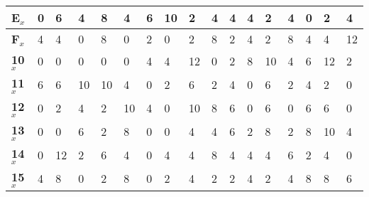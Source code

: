\begin{longtable}[c]{|l|l|l|l|l|l|l|l|l|l|l|l|l|l|l|l|l|}
\textbf{E$_x$}  & 0              & 6              & 4              & 8              & 4              & 6              & 10             & 2              & 4              & 4              & 4              & 2              & 4              & 0              & 2              & 4              \\ \hline
\textbf{F$_x$}  & 4              & 4              & 0              & 8              & 0              & 2              & 0              & 2              & 8              & 2              & 4              & 2              & 8              & 4              & 4              & 12             \\ \hline
\textbf{10$_x$} & 0              & 0              & 0              & 0              & 0              & 4              & 4              & 12             & 0              & 2              & 8              & 10             & 4              & 6              & 12             & 2              \\ \hline
\textbf{11$_x$} & 6              & 6              & 10             & 10             & 4              & 0              & 2              & 6              & 2              & 4              & 0              & 6              & 2              & 4              & 2              & 0              \\ \hline
\textbf{12$_x$} & 0              & 2              & 4              & 2              & 10             & 4              & 0              & 10             & 8              & 6              & 0              & 6              & 0              & 6              & 6              & 0              \\ \hline
\textbf{13$_x$} & 0              & 0              & 6              & 2              & 8              & 0              & 0              & 4              & 4              & 6              & 2              & 8              & 2              & 8              & 10             & 4              \\ \hline
\textbf{14$_x$} & 0              & 12             & 2              & 6              & 4              & 0              & 4              & 4              & 8              & 4              & 4              & 4              & 6              & 2              & 4              & 0              \\ \hline
\textbf{15$_x$} & 4              & 8              & 0              & 2              & 8              & 0              & 2              & 4              & 2              & 2              & 4              & 2              & 4              & 8              & 8              & 6              \\ \hline

\end{longtable}
